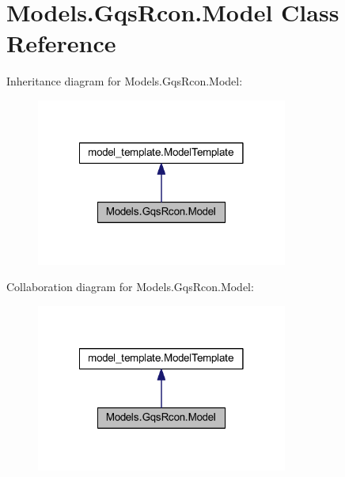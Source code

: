 \hypertarget{class_models_1_1_gqs_rcon_1_1_model}{\section{Models.\-Gqs\-Rcon.\-Model Class Reference}
\label{class_models_1_1_gqs_rcon_1_1_model}
}


Inheritance diagram for Models.\-Gqs\-Rcon.\-Model\-:
\nopagebreak
\begin{figure}[H]
\begin{center}
\leavevmode
\includegraphics[width=234pt]{class_models_1_1_gqs_rcon_1_1_model__inherit__graph}
\end{center}
\end{figure}


Collaboration diagram for Models.\-Gqs\-Rcon.\-Model\-:
\nopagebreak
\begin{figure}[H]
\begin{center}
\leavevmode
\includegraphics[width=234pt]{class_models_1_1_gqs_rcon_1_1_model__coll__graph}
\end{center}
\end{figure}
